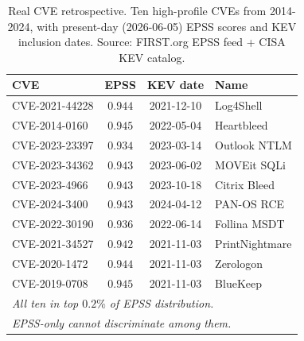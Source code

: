 \begin{table}[!t]
 \caption{Real CVE retrospective. Ten high-profile CVEs from
 2014-2024, with present-day (2026-06-05) EPSS scores and KEV
 inclusion dates. Source: FIRST.org EPSS feed + CISA KEV catalog.}
 \label{tab:famous_cves}
 \centering
 \small
 \setlength{\tabcolsep}{3pt}
 \begin{tabular}{@{}lccl@{}}
 \toprule
 \textbf{CVE} & \textbf{EPSS} & \textbf{KEV date} & \textbf{Name} \\
 \midrule
 CVE-2021-44228 & $0.944$ & 2021-12-10 & Log4Shell \\
 CVE-2014-0160 & $0.945$ & 2022-05-04 & Heartbleed \\
 CVE-2023-23397 & $0.934$ & 2023-03-14 & Outlook NTLM \\
 CVE-2023-34362 & $0.943$ & 2023-06-02 & MOVEit SQLi \\
 CVE-2023-4966 & $0.943$ & 2023-10-18 & Citrix Bleed \\
 CVE-2024-3400 & $0.943$ & 2024-04-12 & PAN-OS RCE \\
 CVE-2022-30190 & $0.936$ & 2022-06-14 & Follina MSDT \\
 CVE-2021-34527 & $0.942$ & 2021-11-03 & PrintNightmare \\
 CVE-2020-1472 & $0.944$ & 2021-11-03 & Zerologon \\
 CVE-2019-0708 & $0.945$ & 2021-11-03 & BlueKeep \\
 \midrule
 \multicolumn{4}{l}{\textit{All ten in top $0.2\%$ of EPSS distribution.}} \\
 \multicolumn{4}{l}{\textit{EPSS-only cannot discriminate among them.}} \\
 \bottomrule
 \end{tabular}
\end{table}
